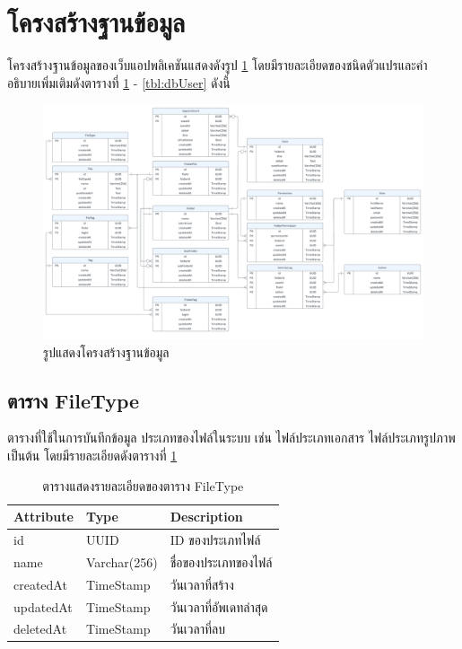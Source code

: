 \documentclass[12pt,oneside,openright,a4paper]{cpe-thai-project}
\begin{document}
\section{โครงสร้างฐานข้อมูล}
\hspace*{1cm}โครงสร้างฐานข้อมูลของเว็บแอปพลิเคชันแสดงดังรูป \ref{fig:erDiagram} โดยมีรายละเอียดของชนิดตัวแปรและคํา
อธิบายเพิ่มเติมดังตารางที่ \ref{tbl:dbFileType} - \ref{tbl:dbUser} ดังนี้
\begin{figure}[!ht]\centering
    \includegraphics[width=16cm]{./assets/er-diagram.png}
    \caption{รูปแสดงโครงสร้างฐานข้อมูล}\label{fig:erDiagram}
\end{figure}

\subsection{ตาราง FileType}
ตารางที่ใช้ในการบันทึกข้อมูล ประเภทของไฟล์ในระบบ เช่น ไฟล์ประเภทเอกสาร ไฟล์ประเภทรูปภาพ เป็นต้น โดยมีรายละเอียดดังตารางที่ \ref{tbl:dbFileType}
\begin{table}[!ht]
    \centering
    \begin{tabular}{|p{4cm}|p{2cm}|p{6cm}|}
    \hline
    \textbf{Attribute} & \textbf{Type} & \textbf{Description}   \\ \hline
    id                 & UUID          & ID ของประเภทไฟล์       \\ \hline
    name               & Varchar(256)   & ชื่อของประเภทของไฟล์   \\ \hline
    createdAt          & TimeStamp     & วันเวลาที่สร้าง        \\ \hline
    updatedAt          & TimeStamp     & วันเวลาที่อัพเดทล่าสุด \\ \hline
    deletedAt          & TimeStamp     & วันเวลาที่ลบ           \\ \hline
    \end{tabular}
    \caption{\centering  ตารางแสดงรายละเอียดของตาราง FileType} \label{tbl:dbFileType}
\end{table}
\end{document}
